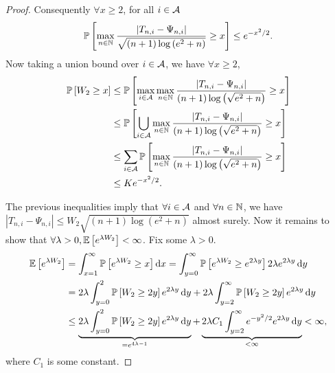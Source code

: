 \begin{proof}
Consequently $\forall x\geq 2$, for all $i \in \mathcal{A}$
\[
    \mathbb{P}\left[\max_{n\in{\mathbb N}}\frac{|T_{n,i}-\Psi_{n,i}|}{\sqrt{\left(n+1\right)\log\left({e^2+n}\right)}}\geq x\right] \leq e^{-x^2/2}.
\]
Now taking a union bound over $i\in\mathcal{A}$, we have $\forall x\geq 2$,
\begin{align*}
    \mathbb{P}\left[W_2\geq x\right] &\leq \mathbb{P}\left[\max_{i\in\mathcal{A}}\max_{n\in{\mathbb N}}\frac{|T_{n,i}-\Psi_{n,i}|}{\left(n+1\right)\log\left(\sqrt{e^2+n}\right)}\geq x\right] \\ 
                 &\leq \mathbb{P}\left[\bigcup_{i\in\mathcal{A}}\max_{n\in{\mathbb N}}\frac{|T_{n,i}-\Psi_{n,i}|}{\left(n+1\right)\log\left(\sqrt{e^2+n}\right)}\geq x\right] \\
                 &\leq \sum_{i\in\mathcal{A}} \mathbb{P}\left[\max_{n\in{\mathbb N}}\frac{|T_{n,i}-\Psi_{n,i}|}{\left(n+1\right)\log\left(\sqrt{e^2+n}\right)}\geq x\right] \\
                 &\leq Ke^{-x^2/2}.
\end{align*}

The previous inequalities imply that $\forall i\in\mathcal{A}$ and $\forall n\in{\mathbb N}$, we have $|T_{n,i}-\Psi_{n,i}| \leq W_2\sqrt{(n+1)\log(e^2+n)}$ almost surely. Now it remains to show that $\forall \lambda > 0, \mathbb{E}\left[e^{\lambda W_2}\right]<\infty$. Fix some $\lambda > 0$.
\begin{align*}
    \mathbb{E}\left[e^{\lambda W_2}\right] &= \int_{x=1}^{\infty} \mathbb{P}\left[e^{\lambda W_2}\geq x\right] \mathop{}\!\mathrm{d}{x} = \int_{y=0}^{\infty} \mathbb{P}\left[e^{\lambda W_2}\geq e^{2\lambda y}\right]2\lambda e^{2\lambda y} \mathop{}\!\mathrm{d}{y} \\
                       &= 2\lambda \int_{y=0}^{2} \mathbb{P}\left[W_2\geq 2y\right] e^{2\lambda y} \mathop{}\!\mathrm{d}{y} + 2\lambda \int_{y=2}^{\infty} \mathbb{P}\left[W_2\geq 2y\right] e^{2\lambda y} \mathop{}\!\mathrm{d}{y} \\
                       &\leq \underbrace{2\lambda \int_{y=0}^{2} \mathbb{P}\left[W_2\geq 2y\right] e^{2\lambda y} \mathop{}\!\mathrm{d}{y}}_{=e^{4\lambda-1}} + \underbrace{2\lambda C_1 \int_{y=2}^{\infty} e^{-y^2/2} e^{2\lambda y} \mathop{}\!\mathrm{d}{y}}_{<\infty} < \infty,
\end{align*}
where $C_1$ is some constant.


\end{proof}